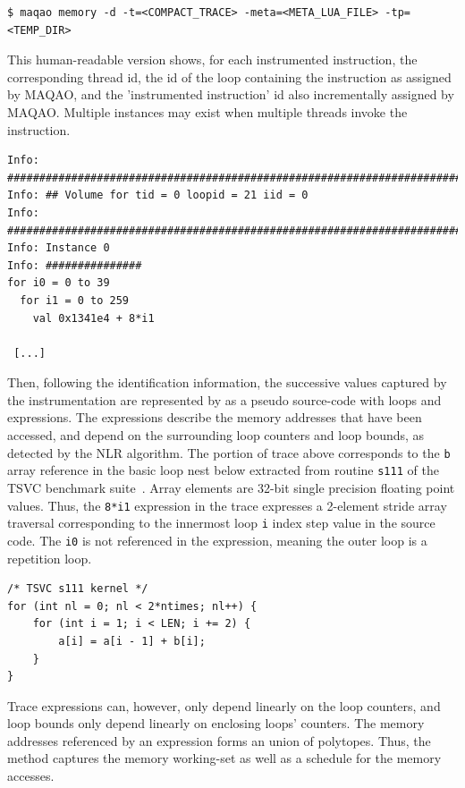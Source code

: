 \documentclass[11pt, a4paper, twoside]{montblanc2}
\begin{document}
\begin{verbatim}
$ maqao memory -d -t=<COMPACT_TRACE> -meta=<META_LUA_FILE> -tp=<TEMP_DIR>
\end{verbatim}

 This human-readable version shows, for each instrumented instruction, the
 corresponding thread id, the id of the loop containing the instruction as
 assigned by MAQAO, and the 'instrumented instruction' id also incrementally
 assigned by MAQAO. Multiple instances may exist when multiple threads invoke
 the instruction.

\begin{footnotesize}
\begin{verbatim}
Info: ################################################################################
Info: ## Volume for tid = 0 loopid = 21 iid = 0
Info: ################################################################################
Info: Instance 0
Info: ###############
for i0 = 0 to 39
  for i1 = 0 to 259
    val 0x1341e4 + 8*i1

 [...]
\end{verbatim}
\end{footnotesize}

Then, following the identification information, the successive values captured
by the instrumentation are represented by as a pseudo source-code with loops and
expressions. The expressions describe the memory addresses that have been
accessed, and depend on the surrounding loop counters and loop bounds, as
detected by the NLR algorithm. The portion of trace above corresponds to the
\texttt{b} array reference in the basic loop nest below extracted from routine
\texttt{s111} of the TSVC benchmark
suite~\cite{maleki:vectorization:pact:2011,callahan:tsvc:sc:1988}. Array
elements are 32-bit single precision floating point values. Thus, the
\texttt{8*i1} expression in the trace expresses a 2-element stride array
traversal corresponding to the innermost loop \texttt{i} index step value in the
source code. The \texttt{i0} is not referenced in the expression, meaning the
outer loop is a repetition loop.

\lstset{style=C}
\begin{lstlisting}
/* TSVC s111 kernel */
for (int nl = 0; nl < 2*ntimes; nl++) {
	for (int i = 1; i < LEN; i += 2) {
		a[i] = a[i - 1] + b[i];
	}
}
\end{lstlisting}

Trace expressions can, however, only depend linearly on the loop counters, and
loop bounds only depend linearly on enclosing loops' counters. The memory
addresses referenced by an expression forms an union of polytopes. Thus, the
method captures the memory working-set as well as a schedule for the memory
accesses.
\end{document}
